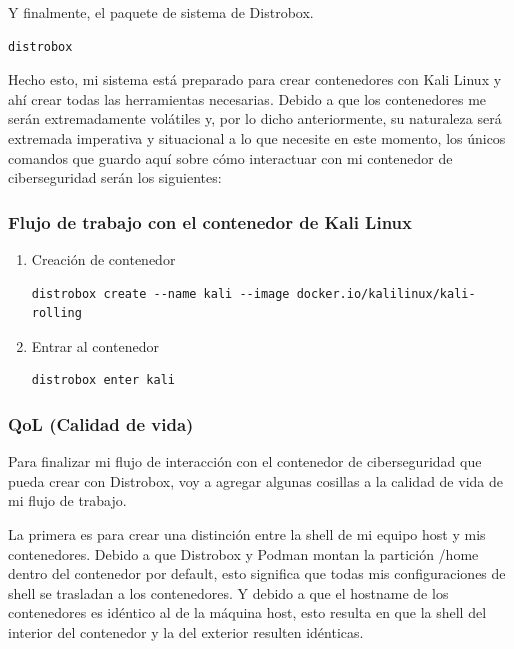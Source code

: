 \documentclass[11pt]{article}
\begin{document}
Y finalmente, el paquete de sistema de Distrobox.

\begin{verbatim}
distrobox
\end{verbatim}

Hecho esto, mi sistema está preparado para crear contenedores con Kali Linux y ahí crear todas las herramientas necesarias. Debido a que los contenedores me serán extremadamente volátiles y, por lo dicho anteriormente, su naturaleza será extremada imperativa y situacional a lo que necesite en este momento, los únicos comandos que guardo aquí sobre cómo interactuar con mi contenedor de ciberseguridad serán los siguientes:
\subsubsection{Flujo de trabajo con el contenedor de Kali Linux}
\label{sec:orgd7517a7}

\begin{enumerate}
\item Creación de contenedor
\label{sec:org7f07e82}

\begin{verbatim}
distrobox create --name kali --image docker.io/kalilinux/kali-rolling
\end{verbatim}
\item Entrar al contenedor
\label{sec:orga25e666}

\begin{verbatim}
distrobox enter kali
\end{verbatim}
\end{enumerate}
\subsubsection{QoL (Calidad de vida)}
\label{sec:orgc6c4b79}

Para finalizar mi flujo de interacción con el contenedor de ciberseguridad que pueda crear con Distrobox, voy a agregar algunas cosillas a la calidad de vida de mi flujo de trabajo.

La primera es para crear una distinción entre la shell de mi equipo host y mis contenedores. Debido a que Distrobox y Podman montan la partición /home dentro del contenedor por default, esto significa que todas mis configuraciones de shell se trasladan a los contenedores. Y debido a que el hostname de los contenedores es idéntico al de la máquina host, esto resulta en que la shell del interior del contenedor y la del exterior resulten idénticas.
\end{document}

